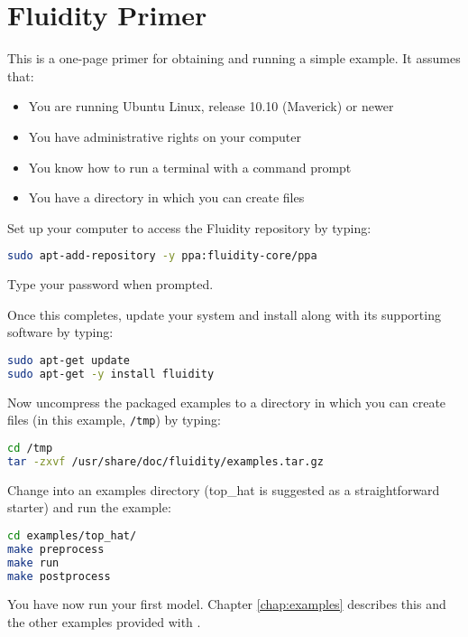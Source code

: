 \chapter*{Fluidity Primer}

This is a one-page primer for obtaining \fluidity and running a simple example. It assumes that:

\begin{itemize}
\item You are running Ubuntu Linux, release 10.10 (Maverick) or newer
\item You have administrative rights on your computer
\item You know how to run a terminal with a command prompt
\item You have a directory in which you can create files
\end{itemize}

Set up your computer to access the Fluidity repository by typing:

\begin{lstlisting}[language=Bash]
sudo apt-add-repository -y ppa:fluidity-core/ppa
\end{lstlisting}

Type your password when prompted.

Once this completes, update your system and install \fluidity along with its
supporting software by typing:

\begin{lstlisting}[language=Bash]
sudo apt-get update
sudo apt-get -y install fluidity
\end{lstlisting}

Now uncompress the packaged examples to a directory in which you can create
files (in this example, \lstinline[language=Bash]+/tmp+) by typing:

\begin{lstlisting}[language=Bash]
cd /tmp
tar -zxvf /usr/share/doc/fluidity/examples.tar.gz
\end{lstlisting}

Change into an examples directory (top\_hat is suggested as a straightforward
starter) and run the example:

\begin{lstlisting}[language=Bash]
cd examples/top_hat/
make preprocess
make run
make postprocess
\end{lstlisting}

You have now run your first \fluidity model. Chapter \ref{chap:examples}
describes this and the other examples provided with \fluidity.  
